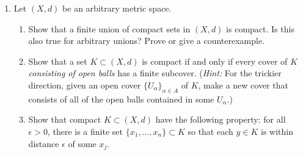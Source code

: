 \documentclass[12pt, letterpaper]{article}
\newcommand{\0}{\mathbf{0}}
\newcommand{\1}{\mathbf{1}}
\begin{document}
\begin{enumerate}
\begin{enumerate}
        \item 
        Find a set $A \subset E$ (other than $\varnothing$ or $E$) that is clopen w.r.t. the subspace metric on $(E, d)$, and conclude that $E$ is not connected. You may again find picking an irrational $r \in [0, 1]$ helpful.

        \item 
        With respect to $(\mathbb{R}, d)$, is the set $A$ you chose in part (b) open, closed, both, or neither? Explain.
        
    \end{enumerate} 

    \vspace{0.5cm}

    \item 
    Let $(X, d)$ be an arbitrary metric space.
    \begin{enumerate}
        \item 
        Show that a finite union of compact sets in $(X, d)$ is compact. Is this also true for arbitrary unions? Prove or give a counterexample.

        \item 
        Show that a set $K \subset (X, d)$ is compact if and only if every cover of $K$ \textit{consisting of open balls} has a finite subcover. (\textit{Hint:} For the trickier direction, given an open cover $\{U_\alpha\}_{\alpha \in A}$ of $K$, make a new cover that consists of all of the open balls contained in some $U_\alpha$.)

        \item 
        Show that compact $K \subset (X, d)$ have the following property: for all $\epsilon > 0$, there is a finite set $\{x_1, \dots, x_n\} \subset K$ so that each $y \in K$ is within distance $\epsilon$ of some $x_j$.
        
    \end{enumerate}



    
    
    
    
    
    
    
\end{enumerate}
\end{document}
